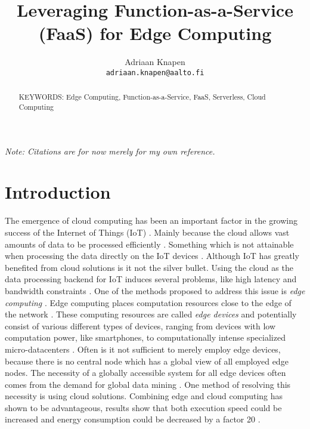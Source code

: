 \documentclass[article]{aaltoseries}
\begin{document}
 

\title{Leveraging Function-as-a-Service (FaaS) for Edge Computing}

\author{Adriaan Knapen%
\\\textnormal{\texttt{adriaan.knapen@aalto.fi}}} %


\maketitle


\begin{abstract}

\vspace{3mm}
\noindent KEYWORDS: Edge Computing, Function-as-a-Service, FaaS, Serverless, Cloud Computing

\end{abstract}


\emph{Note: Citations are for now merely for my own reference.}

\section{Introduction} 
The emergence of cloud computing has been an important factor in the growing success of the Internet of Things (IoT) \cite{shi_promise_2016}.
Mainly because the cloud allows vast amounts of data to be processed efficiently \cite{shi_promise_2016}.
Something which is not attainable when processing the data directly on the IoT devices  \cite{shi_promise_2016}.
Although IoT has greatly benefited from cloud solutions is it not the silver bullet. %
Using the cloud as the data processing backend for IoT induces several problems, like high latency and bandwidth constraints \cite{shi_edge_2016}.
One of the methods proposed to address this issue is \emph{edge computing} \cite{shi_edge_2016}.
Edge computing places computation resources close to the edge of the network \cite{shi_promise_2016}.
These computing resources are called \emph{edge devices} and potentially consist of various different types of devices, ranging from devices with low computation power, like smartphones, to computationally intense specialized micro-datacenters \cite{shi_promise_2016}.
Often is it not sufficient to merely employ edge devices, because there is no central node which has a global view of all employed edge nodes.
The necessity of a globally accessible system for all edge devices often comes from the demand for global data mining \cite{bonomi_fog_2012}.
One method of resolving this necessity is using cloud solutions.
Combining edge and cloud computing has shown to be advantageous, results show that both execution speed could be increased and energy consumption could be decreased by a factor 20 \cite{chun_clonecloud:_2011}.
\end{document}
